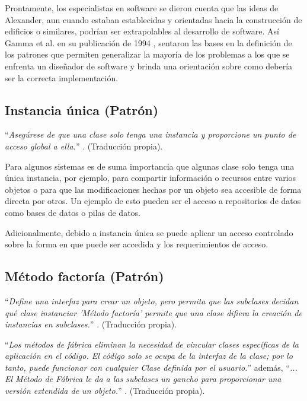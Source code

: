        Prontamente, los especialistas en software se dieron cuenta que las ideas de Alexander, aun cuando estaban establecidas y orientadas hacia la construcción de edificios o similares, podrían ser extrapolables al desarrollo de software. Así Gamma et al. en su publicación de 1994 \cite{Gamma1994}, sentaron las bases en la definición de los patrones que permiten generalizar la mayoría de los problemas a los que se enfrenta un diseñador de software y brinda una orientación sobre como debería ser la correcta implementación.
    
    \subsection{Instancia única (Patrón)}
    \label{sub:FrameSingleton}
    
    ``\textit{Asegúrese de que una clase solo tenga una instancia y proporcione un punto de acceso global a ella.}'' \cite[Pág. 144]{Gamma1994}. (Traducción propia).
    
    Para algunos sistemas es de suma importancia que algunas clase solo tenga una única instancia, por ejemplo, para compartir información o recursos entre varios objetos o para que las modificaciones hechas por un objeto sea accesible de forma directa por otros. Un ejemplo de esto pueden ser el acceso a repositorios de datos como bases de datos o pilas de datos.
    
    Adicionalmente, debido a instancia única se puede aplicar un acceso controlado sobre la forma en que puede ser accedida y los requerimientos de acceso.
    
    \subsection{Método factoría (Patrón)}
    \label{sub:FrameFactoryMethod}
        
        ``\textit{Define una interfaz para crear un objeto, pero permita que las subclases decidan qué clase instanciar 'Método factoría' permite que una clase difiera la creación de instancias en subclases.}'' \cite[Pág. 121]{Gamma1994}. (Traducción propia).
        
        ``\textit{Los métodos de fábrica eliminan la necesidad de vincular clases específicas de la aplicación en el código. El código solo se ocupa de la interfaz de la clase; por lo tanto, puede funcionar con cualquier Clase definida por el usuario.}'' además, ``\textit{... El Método de Fábrica le da a las subclases un gancho para proporcionar una versión extendida de un objeto.}'' \cite[Pág. 123]{Gamma1994}. (Traducción propia).
        
